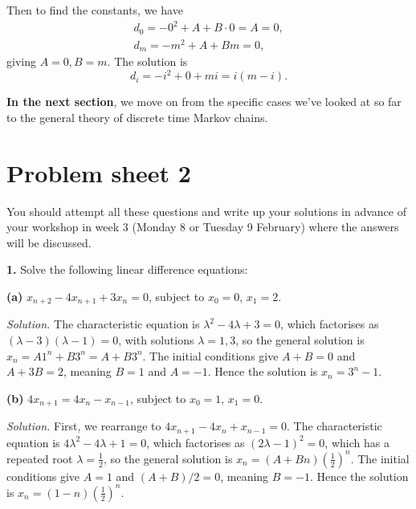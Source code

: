 \documentclass[
  a4paper,
]{article}
\newif\ifcomm\commtrue
\theoremstyle{definition}
\theoremstyle{definition}
\theoremstyle{definition}
\theoremstyle{remark}
\begin{document}
Then to find the constants, we have
\begin{gather*} d_0 = -0^2 + A + B\cdot0 = A = 0, \\
                  d_m = -m^2 + A + Bm = 0 , \end{gather*}
giving \(A = 0, B = m\). The solution is
\[ d_i = -i^2 + 0 + mi = i(m-i) .\]

\textbf{In the next section}, we move on from the specific cases we've looked at so far to the general theory of discrete time Markov chains.

\hypertarget{P02}{%
\section*{Problem sheet 2}\label{P02}}

\commtrue

You should attempt all these questions and write up your solutions in advance of your workshop in week 3 (Monday 8 or Tuesday 9 February) where the answers will be discussed.

\textbf{1.} Solve the following linear difference equations:

\textbf{(a)} \(x_{n+2} - 4x_{n+1} + 3x_{n} = 0\), subject to \(x_0 = 0\), \(x_1 = 2\).

\begin{myanswers}

\emph{Solution.} The characteristic equation is \(\lambda^2 - 4\lambda + 3 = 0\), which factorises as \((\lambda - 3)(\lambda - 1) = 0\), with solutions \(\lambda = 1,3\), so the general solution is \(x_n = A1^n + B3^n = A + B3^n\). The initial conditions give \(A+B = 0\) and \(A + 3B = 2\), meaning \(B = 1\) and \(A = -1\). Hence the solution is \(x_n = 3^n - 1\).

\end{myanswers}

\textbf{(b)} \(4x_{n+1} = 4x_n - x_{n-1}\), subject to \(x_0 = 1\), \(x_1 = 0\).

\begin{myanswers}

\emph{Solution.} First, we rearrange to \(4x_{n+1} - 4x_n + x_{n-1} = 0\). The characteristic equation is \(4\lambda^2 - 4\lambda + 1 = 0\), which factorises as \((2\lambda - 1)^2 = 0\), which has a repeated root \(\lambda = \frac12\), so the general solution is \(x_n = (A + Bn)(\frac12)^n\). The initial conditions give \(A=1\) and \((A + B)/2 = 0\), meaning \(B = -1\). Hence the solution is \(x_n = (1 - n)(\frac12)^n\).

\end{myanswers}
\end{document}
